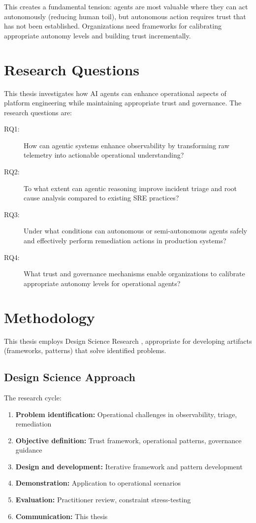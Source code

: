 This creates a fundamental tension: agents are most valuable where they can act autonomously (reducing human toil), but autonomous action requires trust that has not been established. Organizations need frameworks for calibrating appropriate autonomy levels and building trust incrementally.

\section{Research Questions}
\label{sec:research-questions}

This thesis investigates how AI agents can enhance operational aspects of platform engineering while maintaining appropriate trust and governance. The research questions are:

\begin{description}
    \item[RQ1:] How can agentic systems enhance observability by transforming raw telemetry into actionable operational understanding?
    \item[RQ2:] To what extent can agentic reasoning improve incident triage and root cause analysis compared to existing SRE practices?
    \item[RQ3:] Under what conditions can autonomous or semi-autonomous agents safely and effectively perform remediation actions in production systems?
    \item[RQ4:] What trust and governance mechanisms enable organizations to calibrate appropriate autonomy levels for operational agents?
\end{description}

\section{Methodology}
\label{sec:methodology}

This thesis employs Design Science Research \citep{hevner2004,peffers2007}, appropriate for developing artifacts (frameworks, patterns) that solve identified problems.

\subsection{Design Science Approach}
\label{subsec:design-science}

The research cycle:
\begin{enumerate}
    \item \textbf{Problem identification:} Operational challenges in observability, triage, remediation
    \item \textbf{Objective definition:} Trust framework, operational patterns, governance guidance
    \item \textbf{Design and development:} Iterative framework and pattern development
    \item \textbf{Demonstration:} Application to operational scenarios
    \item \textbf{Evaluation:} Practitioner review, constraint stress-testing
    \item \textbf{Communication:} This thesis
\end{enumerate}

